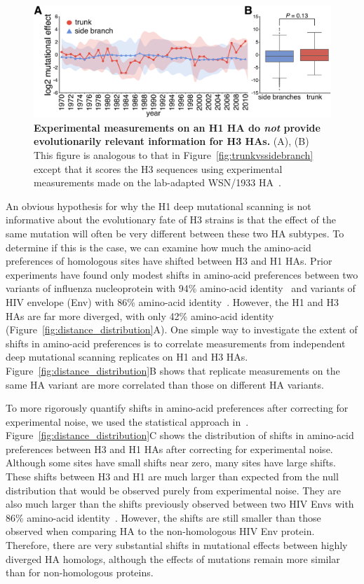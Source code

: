 \documentclass[9pt,twocolumn,twoside]{pnas-new}
\begin{document}
\begin{figure}
\centering
\includegraphics[width=\columnwidth]{figs/WSN_trunkvssidebranch/WSN_trunkvssidebranch.pdf}
\caption{\label{fig:WSN_trunkvssidebranch}
{\bf Experimental measurements on an H1 HA do \emph{not} provide evolutionarily relevant information for H3 HAs.}
(A), (B) This figure is analogous to that in Figure~\ref{fig:trunkvssidebranch} except that it scores the H3 sequences using experimental measurements made on the lab-adapted WSN/1933 HA~\cite{doud2016accurate}.
}
\end{figure}

An obvious hypothesis for why the H1 deep mutational scanning is not informative about the evolutionary fate of H3 strains is that the effect of the same mutation will often be very different between these two HA subtypes.
To determine if this is the case, we can examine how much the amino-acid preferences of homologous sites have shifted between H3 and H1 HAs.
Prior experiments have found only modest shifts in amino-acid preferences between two variants of influenza nucleoprotein with 94\% amino-acid identity~\cite{doud2015site} and variants of HIV envelope (Env) with 86\% amino-acid identity~\cite{haddox2017mapping}.
However, the H1 and H3 HAs are far more diverged, with only 42\% amino-acid identity (Figure~\ref{fig:distance_distribution}A).
One simple way to investigate the extent of shifts in amino-acid preferences is to correlate measurements from independent deep mutational scanning replicates on H1 and H3 HAs.
Figure~\ref{fig:distance_distribution}B shows that replicate measurements on the same HA variant are more correlated than those on different HA variants.

To more rigorously quantify shifts in amino-acid preferences after correcting for experimental noise, we used the statistical approach in~\cite{doud2015site,haddox2017mapping}.
Figure~\ref{fig:distance_distribution}C shows the distribution of shifts in amino-acid preferences between H3 and H1 HAs after correcting for experimental noise.
Although some sites have small shifts near zero, many sites have large shifts.
These shifts between H3 and H1 are much larger than expected from the null distribution that would be observed purely from experimental noise.
They are also much larger than the shifts previously observed between two HIV Envs with 86\% amino-acid identity~\cite{haddox2017mapping}.
However, the shifts are still smaller than those observed when comparing HA to the non-homologous HIV Env protein. 
Therefore, there are very substantial shifts in mutational effects between highly diverged HA homologs, although the effects of mutations remain more similar than for non-homologous proteins.
\end{document}

